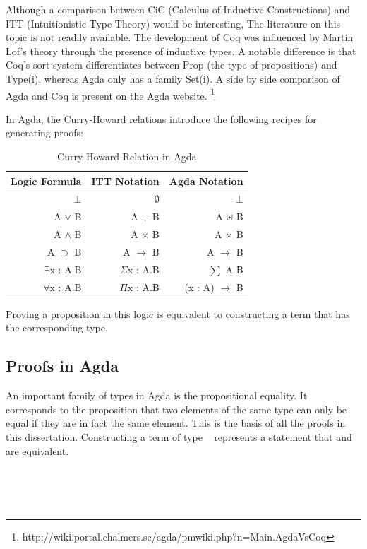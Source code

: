 \documentclass[12pt,twoside,notitlepage]{report}
\begin{document}
Although a comparison between CiC (Calculus of Inductive Constructions) and ITT (Intuitionistic Type Theory) would be interesting, The literature on this topic is not readily available. The development of Coq was influenced by Martin Lof’s theory through the presence of inductive types\cite{certified}. A notable difference is that Coq’s sort system differentiates between Prop (the type of propositions) and Type(i), whereas Agda only has a family Set(i). A side by side comparison of Agda and Coq is present on the Agda website. \footnote{http://wiki.portal.chalmers.se/agda/pmwiki.php?n=Main.AgdaVsCoq}

In Agda, the Curry-Howard relations introduce the following recipes for generating proofs:

\begin{table}[h!]
\centering
	\begin{tabular}{r r r} 
	\hline 
	Logic Formula & ITT Notation & Agda Notation \\
	\hline
	$⊥$  & $∅$  & $⊥$ \\
	A $∨$ B & A + B &   A $⊎$ B \\
	A $∧$ B & A $×$ B &   A $×$ B \\
	A $⊃$ B & A $→$ B &   A $→$ B \\ 
	$∃$x : A.B & $Σ$x : A.B & $\sum$ A B \\
	$∀$x : A.B & $Π$x : A.B & (x : A) $→$  B\\ 
	\hline
	\end{tabular}
\caption{Curry-Howard Relation in Agda}
\label{tab:curry}
\end{table} 

Proving a proposition in this logic is equivalent to constructing a term that has the corresponding type.

\subsection{Proofs in Agda}

An important family of types in Agda is the propositional equality. It corresponds to the proposition that two elements of the same type can only be equal if they are in fact the same element. 
This is the basis of all the proofs in this dissertation. Constructing a term of type \mbox{  } represents a statement that  and  are equivalent.

\begin{code}
\\
\>  \AgdaSymbol{\{}\AgdaSymbol{\}} \AgdaSymbol{\{} \AgdaSymbol{:}  \AgdaSymbol{\}} \AgdaSymbol{(} \AgdaSymbol{:} \AgdaSymbol{)} \AgdaSymbol{:}     \<%
\\
\>[0]\<[2]%
\>[2] \AgdaSymbol{:}   \<%
\\
\end{code}
\end{document}

